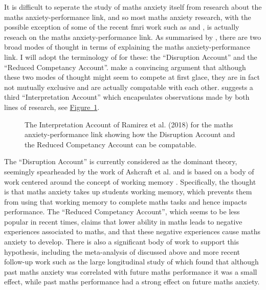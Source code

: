 \documentclass[14pt]{memoir}
\newcommand{\reffig}[1]{\hyperref[fig:#1]{Figure~\ref{fig:#1}}}
\begin{document}
It is difficult to seperate the study of maths anxiety itself from research about the maths anxiety-performance link, and so most maths anxiety research, with the possible exception of some of the recent \gls{fmri} work such as  and , is actually reseach on the maths anxiety-performance link. As summarised by , there are two broad modes of thought in terms of explaining the maths anxiety-performance link. I will adopt the terminology of  for these: the ``Disruption Account'' and the ``Reduced Competancy Account''.  make a convincing argument that although these two modes of thought might seem to compete at first glace, they are in fact not mutually exclusive and are actually compatable with each other.  suggests a third ``Interpretation Account'' which encapsulates observations made by both lines of research, see \reffig{ramirez}.

\begin{center}
\begin{figure}
\begin{center}
\end{center}
\caption{The Interpretation Account of Ramirez et al. (2018) for the maths anxiety-performance link showing how the Disruption Account and the Reduced Competancy Account can be compatable.
\label{fig:ramirez}}
\end{figure}
\end{center}

The ``Disruption Account'' is currently considered as the dominant theory, seemingly spearheaded by the work of Ashcraft et al. and is based on a body of work centered around the concept of working memory \cite{Ashcraft2001, Ashcraft2007}. Specifically, the thought is that maths anxiety takes up students working memory, which prevents them from using that working memory to complete maths tasks and hence impacts performance. The ``Reduced Competancy Account'', which seems to be less popular in recent times, claims that lower ability in maths leads to negative experiences associated to maths, and that these negative experiences cause maths anxiety to develop. There is also a significant body of work to support this hypothesis, including the meta-analysis of  discussed above and more recent follow-up work such as the large longitudinal study of  which found that although past maths anxiety was correlated with future maths performance it was a small effect, while past maths performance had a strong effect on future maths anxiety.
\end{document}
